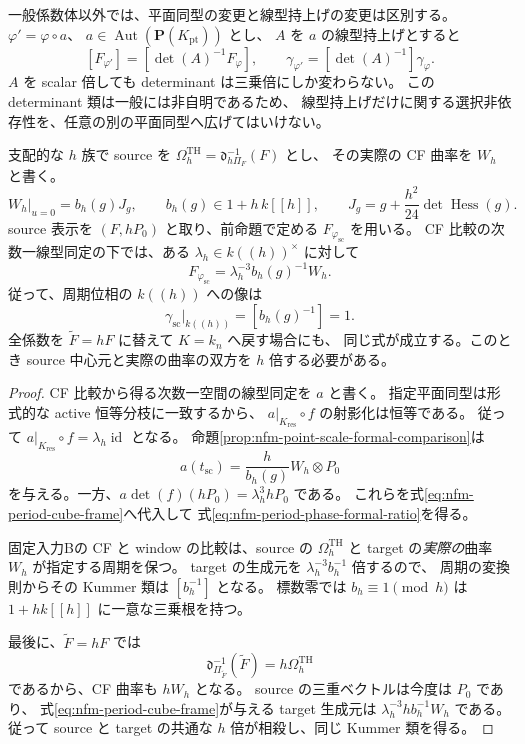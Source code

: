 一般係数体以外では、平面同型の変更と線型持上げの変更は区別する。
$\varphi' =\varphi\circ a$、
$a\in\operatorname{Aut}(\mathbf P(K_{\mathrm{pt}}))$ とし、
$A$ を $a$ の線型持上げとすると
\[
 [F_{\varphi'}]=[\det(A)^{-1}F_\varphi],
 \qquad \gamma_{\varphi'}=[\det(A)^{-1}]\gamma_\varphi.
\]
$A$ を scalar 倍しても determinant は三乗倍にしか変わらない。
この determinant 類は一般には非自明であるため、
線型持上げだけに関する選択非依存性を、任意の別の平面同型へ広げてはいけない。

\begin{proposition}
\label{prop:nfm-period-phase-formal-active-scalar}
支配的な $h$ 族で source を
$\Omega_h^{\mathrm{TH}}=\mathfrak d_{h\Pi_F}^{-1}(F)$ とし、
その実際の CF 曲率を $W_h$ と書く。
\[
 W_h|_{u=0}=b_h(g)J_g,
 \qquad b_h(g)\in1+h\,k[[h]],
 \qquad J_g=g+\frac{h^2}{24}\det\operatorname{Hess}(g).
\]
source 表示を $(F,hP_0)$ と取り、前命題で定める
$F_{\varphi_{\mathrm{sc}}}$ を用いる。
CF 比較の次数一線型同定の下では、ある
$\lambda_h\in k((h))^\times$ に対して
\begin{equation}\label{eq:nfm-period-phase-formal-ratio}
 F_{\varphi_{\mathrm{sc}}}
       =\lambda_h^{-3}b_h(g)^{-1}W_h.
\end{equation}
従って、周期位相の $k((h))$ への像は
\begin{equation}\label{eq:nfm-period-phase-active-scalar}
 \gamma_{\mathrm{sc}}|_{k((h))}=[b_h(g)^{-1}]=1.
\end{equation}
全係数を $\widetilde F=hF$ に替えて $K=k_n$ へ戻す場合にも、
同じ式が成立する。このとき source 中心元と実際の曲率の双方を
$h$ 倍する必要がある。
\end{proposition}

\begin{proof}
CF 比較から得る次数一空間の線型同定を $a$ と書く。
指定平面同型は形式的な active 恒等分枝に一致するから、
$a|_{K_{\mathrm{res}}}\circ f$ の射影化は恒等である。
従って $a|_{K_{\mathrm{res}}}\circ f=\lambda_h\operatorname{id}$ となる。
命題\ref{prop:nfm-point-scale-formal-comparison}は
\[
 a(t_{\mathrm{sc}})=\frac{h}{b_h(g)}W_h\otimes P_0
\]
を与える。一方、$a\det(f)(hP_0)=\lambda_h^3hP_0$ である。
これらを式\eqref{eq:nfm-period-cube-frame}へ代入して
式\eqref{eq:nfm-period-phase-formal-ratio}を得る。

固定入力Bの CF と window の比較は、source の $\Omega_h^{\mathrm{TH}}$ と
target の\emph{実際の}曲率 $W_h$ が指定する周期を保つ。
target の生成元を $\lambda_h^{-3}b_h^{-1}$ 倍するので、
周期の変換則からその Kummer 類は $[b_h^{-1}]$ となる。
標数零では $b_h\equiv1\pmod h$ は $1+h k[[h]]$ に一意な三乗根を持つ。

最後に、$\widetilde F=hF$ では
\[
 \mathfrak d_{\Pi_{\widetilde F}}^{-1}(\widetilde F)
       =h\Omega_h^{\mathrm{TH}}
\]
であるから、CF 曲率も $hW_h$ となる。
source の三重ベクトルは今度は $P_0$ であり、
式\eqref{eq:nfm-period-cube-frame}が与える target 生成元は
$\lambda_h^{-3}h b_h^{-1}W_h$ である。
従って source と target の共通な $h$ 倍が相殺し、同じ Kummer 類を得る。
\end{proof}

